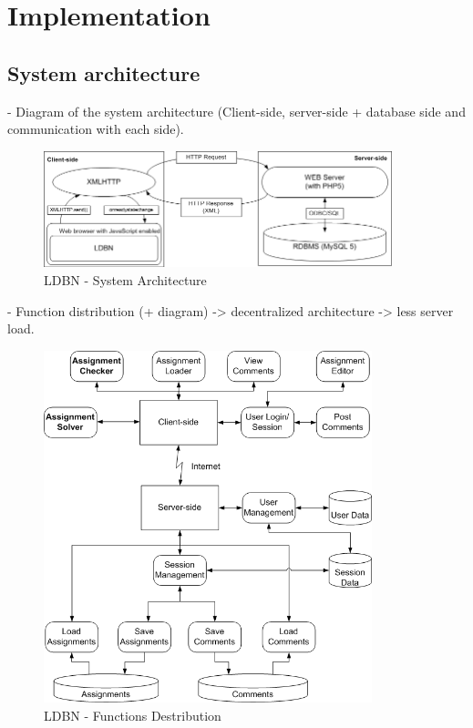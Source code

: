 \section{Implementation}
\label{sec:approach-impl}
\subsection{System architecture}
- Diagram of the system architecture 
(Client-side, server-side + database side and communication with each side).

\begin{figure}[h]
	\begin{center}
		\includegraphics[width=0.9\textwidth]{./img/design01.png}
		\caption{LDBN - System Architecture}
		\label{fig:sysarch}
	\end{center}
\end{figure}

- Function distribution (+ diagram) -> decentralized architecture -> less 
server load.

\begin{figure}[h]
	\begin{center}
		\includegraphics[width=0.85\textwidth]{./img/functions01.png}
		\caption{LDBN - Functions Destribution}
		\label{fig:funcdist}
	\end{center}
\end{figure}

